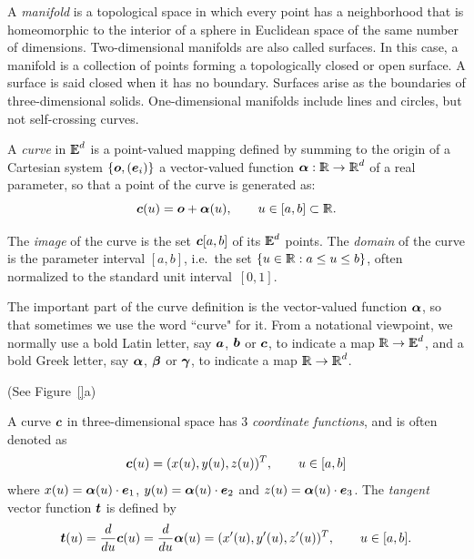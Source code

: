 \begin{coding}[Algebraic computation of FE = $\delta_1$]
A \emph{manifold} is a topological space in which every point has a neighborhood that is homeomorphic to the interior of a sphere in Euclidean space of the same number of dimensions. 
Two-dimensional manifolds are also called surfaces.  
In this case, a manifold is a collection of points forming a topologically closed or open surface. 
A surface is said closed when it has no boundary.
Surfaces arise as the boundaries of three-dimensional solids.
One-dimensional manifolds include lines and circles, but not self-crossing curves. 


\begin{definition}[Curve]
A \emph{curve} in $ \mathbb{I\!\!E}^d$ is a point-valued mapping defined by summing
to the origin of a Cartesian system $\{ {\mbox{\boldmath $o$}}, ({\mbox{\boldmath $e$}}_{i}) \}$ a
vector-valued function ${\mbox{\boldmath $\alpha$}}: \mathbb{I\!\!R} \rightarrow \mathbb{I\!\!R}^{d}$ of a real
parameter, so that a point of the curve is generated as:
\[
{\mbox{\boldmath $c$}}(u) = {\mbox{\boldmath $o$}} + {\mbox{\boldmath $\alpha$}}(u), \qquad u\in[a,b]\subset\mathbb{I\!\!R}.
\]
\end{definition}


\begin{definition}
The \emph{image} of the curve is the set ${\mbox{\boldmath $c$}}[a,b]$ of its $ \mathbb{I\!\!E}^d$
points.  The \emph{domain} of the curve is the parameter interval
$[a,b]$, i.e.~the set $\{u\in\mathbb{I\!\!R} : a\leq u\leq b \}$, often norm\-alized to
the standard unit interval~$[0,1]$.
\end{definition}


The important part of the curve definition is the vector-valued
function ${{\mbox{\boldmath $\alpha$}}}$, so that sometimes we use the word ``curve" for
it.  From a notational viewpoint, we normally use a bold Latin letter,
say ${\mbox{\boldmath $a$}}$, ${\mbox{\boldmath $b$}}$ or ${\mbox{\boldmath $c$}}$, to indicate a map $\mathbb{I\!\!R} \rightarrow
\mathbb{I\!\!E}^d$, and a bold Greek letter, say ${\mbox{\boldmath $\alpha$}}$, ${\mbox{\boldmath $\beta$}}$ or
${\mbox{\boldmath $\gamma$}}$, to indicate a map $\mathbb{I\!\!R} \rightarrow \mathbb{I\!\!R}^d$.  



\begin{condition}[(3D curve] (See Figure~\ref{}a)

A curve ${\mbox{\boldmath $c$}}$ in three-dimensional space has 3 \emph{coordinate
functions}, and is often denoted as
\[
{\mbox{\boldmath $c$}}(u) = (x(u),  y(u), z(u))^T,
\qquad u\in [a,b]
\]
where ${x}(u) = {\mbox{\boldmath $\alpha$}}(u) \cdot {\mbox{\boldmath $e$}}_{1}$, ${y}(u) =
{\mbox{\boldmath $\alpha$}}(u) \cdot {\mbox{\boldmath $e$}}_{2}$ and ${z}(u) = {\mbox{\boldmath $\alpha$}}(u) \cdot
{\mbox{\boldmath $e$}}_{3}$.  The \emph{tangent} vector function ${\mbox{\boldmath $t$}}$ is defined
by
\[
{\mbox{\boldmath $t$}}(u) = {d  \over d u} {\mbox{\boldmath $c$}}(u) = {d  \over d u} {\mbox{\boldmath $\alpha$}}(u) =
(x'(u), y'(u), z'(u))^T, \qquad u\in [a,b].
\]


\end{condition}
\end{coding}
